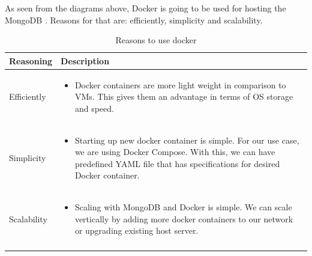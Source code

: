 As seen from the diagrams above, Docker \parencite{rad2017introduction} is going to be used for hosting the MongoDB \parencite{web:MongoDocker}. Reasons for that are: efficiently, simplicity and scalability.
\begin{center}
\begin{longtable}{ |m{4cm}|m{9cm}| } 
 \hline
 Reasoning & Description \\ 
 \hline
  Efficiently & 
  \begin{itemize}
    \item Docker containers are more light weight in comparison to VMs. This gives them an advantage in terms of OS storage and speed.
  \end{itemize} \\ 
  \hline
  Simplicity & 
  \begin{itemize}
    \item Starting up new docker container is simple. For our use case, we are using Docker Compose. With this, we can have predefined YAML file that has specifications for desired Docker container.
  \end{itemize} \\ 
   \hline
  Scalability & 
  \begin{itemize}
    \item Scaling with MongoDB and Docker is simple. We can scale vertically by adding more docker containers to our network or upgrading existing host server.
  \end{itemize} \\ 
 \hline
\caption{Reasons to use docker}
\end{longtable}
\end{center}


